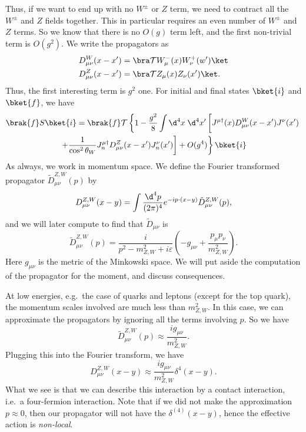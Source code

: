 \documentclass[a4paper]{article}
\begin{document}
Thus, if we want to end up with no $W^{\pm}$ or $Z$ term, we need to contract all the $W^{\pm}$ and $Z$ fields together. This in particular requires an even number of $W^{\pm}$ and $Z$ terms. So we know that there is no $O(g)$ term left, and the first non-trivial term is $O(g^2)$. We write the propagators as
\begin{align*}
  D_{\mu\nu}^W (x - x') &= \bra \mathcal{T} W_\mu^-(x) W_\nu^+(w')\ket\\
  D_{\mu\nu}^Z (x - x') &= \bra \mathcal{T} Z_\mu(x) Z_\nu(x') \ket.
\end{align*}
Thus, the first interesting term is $g^2$ one. For initial and final states $\bket{i}$ and $\bket{f}$, we have
\begin{multline*}
  \brak{f}S\bket{i} = \brak{f} \mathcal{T} \left\{ 1 - \frac{g^2}{8} \int \d^4 x\; \d^4 x'\left[J^{\mu\dagger}(x) D_{\mu\nu}^W (x - x') J^\nu(x') \vphantom{\frac{1}{\cos^2 \theta_W}}\right.\right. \\
  \left.\left.+ \frac{1}{\cos^2 \theta_W} J_n^{\mu\dagger} D_{\mu\nu}^Z (x - x') J_n^\nu(x')\right] + O(g^4)\right\}\bket{i}
\end{multline*}
As always, we work in momentum space. We define the Fourier transformed propagator $\tilde{D}_{\mu\nu}^{Z, W}(p)$ by
\[
  D_{\mu\nu}^{Z, W} (x - y) = \int \frac{\d^4 p}{(2\pi)^4} e^{-ip\cdot (x - y)} \tilde{D}_{\mu\nu}^{Z, W}(p),
\]
and we will later compute to find that $\tilde{D}_{\mu\nu}$ is
\[
  \tilde{D}_{\mu\nu}^{Z, W} (p) = \frac{i}{p^2 - m_{Z, W}^2 + i \varepsilon}\left(-g_{\mu\nu} + \frac{p_\mu p_\nu}{m^2_{Z, W}}\right).
\]
Here $g_{\mu\nu}$ is the metric of the Minkowski space. We will put aside the computation of the propagator for the moment, and discuss consequences.

At low energies, e.g.\ the case of quarks and leptons (except for the top quark), the momentum scales involved are much less than $m^2_{Z, W}$. In this case, we can approximate the propagators by ignoring all the terms involving $p$. So we have
\[
  \tilde{D}^{Z, W}_{\mu\nu}(p) \approx \frac{i g_{\mu\nu}}{m_{Z, W}^2}.
\]
Plugging this into the Fourier transform, we have
\[
  D_{\mu\nu}^{Z, W}(x - y) \approx \frac{ig_{\mu\nu}}{m^2_{Z, W}} \delta^4(x - y).
\]
What we see is that we can describe this interaction by a contact interaction, i.e.\ a four-fermion interaction. Note that if we did not make the approximation $p \approx 0$, then our propagator will not have the $\delta^{(4)}(x - y)$, hence the effective action is \emph{non-local}.
\end{document}
